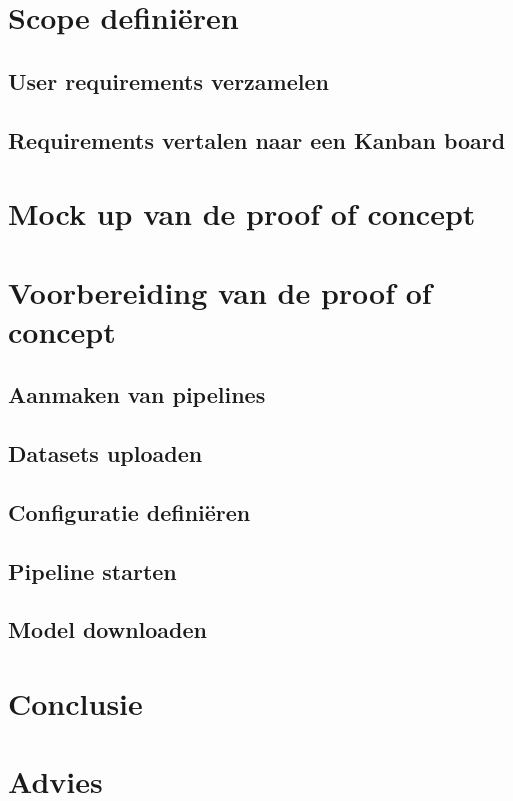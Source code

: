 
\section{Scope definiëren}

\subsection{User requirements verzamelen}

\subsection{Requirements vertalen naar een Kanban board}

\section{Mock up van de proof of concept}

\section{Voorbereiding van de proof of concept}

\subsection{Aanmaken van pipelines}
\subsection{Datasets uploaden}
\subsection{Configuratie definiëren}
\subsection{Pipeline starten}
\subsection{Model downloaden}


\section{Conclusie}
\section{Advies}
